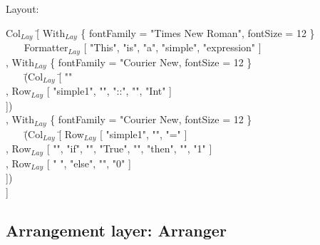 Layout:
\small \ttfamily
\begin{tabbing}
Col$_{Lay}$ \= [  With$_{Lay}$ \{ fontFamily = "Times New Roman", fontSize = 12 \}\\
                    \>  ~~~ Formatter$_{Lay}$ [ "This", "is", "a", "simple", "expression" ]\\
                    \> , With$_{Lay}$ \{ fontFamily = "Courier New,  fontSize = 12 \}\\
                    \>  ~~~ \= (Col$_{Lay}$ \= [ "" \\
                    \>          \>        \> , Row$_{Lay}$ [ "simple1", "\textvisiblespace", "::",
                                                                              "\textvisiblespace", "Int" ]\\
                    \>          \>        \> ])\\
                    \> , With$_{Lay}$ \{ fontFamily = "Courier New,  fontSize = 12 \}\\
                    \>  ~~~ \= (Col$_{Lay}$ \= [ Row$_{Lay}$ [ "simple1", "\textvisiblespace", "=" ]\\
                    \>          \>        \> , Row$_{Lay}$  [ "\textvisiblespace\textvisiblespace", 
                                                                              "if", "\textvisiblespace", "True", "\textvisiblespace", 
                                                                              "then", "\textvisiblespace", "1" ]\\
                    \>          \>        \> , Row$_{Lay}$ [ "\textvisiblespace\textvisiblespace\textvisiblespace
                                                                              \textvisiblespace\textvisiblespace\textvisiblespace
                                                                              \textvisiblespace\textvisiblespace\textvisiblespace                                                                                    \textvisiblespace ", "else", "\textvisiblespace", "0" ]\\
                    \>          \>        \> ])\\
                    \> ]
\end{tabbing}
\rmfamily \normalsize

\subsection{Arrangement layer: Arranger} \label{sect:arranger}

